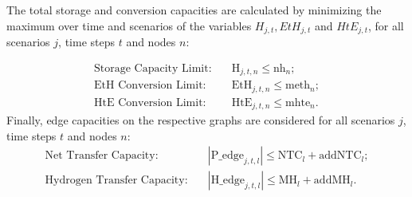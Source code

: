 The total storage and conversion capacities are calculated by minimizing the maximum over time and scenarios of the variables $H_{j,t}, EtH_{j,t}$ and $HtE_{j,t}$, for all scenarios \(j\), time steps \(t\) and nodes \(n\):

\begin{align*}
    \text{Storage Capacity Limit:} \quad & \text{H}_{j,t,n} \leq \text{nh}_n ;\\
    \text{EtH Conversion Limit:} \quad & \text{EtH}_{j,t,n} \leq \text{meth}_n;\\
    \text{HtE Conversion Limit:} \quad & \text{HtE}_{j,t,n} \leq \text{mhte}_n .
\end{align*}
Finally, edge capacities on the respective graphs are considered for all scenarios \(j\), time steps \(t\) and nodes \(n\):
\begin{align*}
    \text{Net Transfer Capacity:} \quad & |\text{P\_edge}_{j,t,l}|\le\text{NTC}_l + \text{addNTC}_l ;\\
    \text{Hydrogen Transfer Capacity:} \quad & |\text{H\_edge}_{j,t,l}|\le\text{MH}_l + \text{addMH}_l.
\end{align*}




